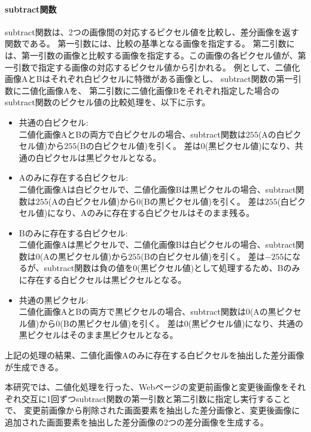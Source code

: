 \paragraph{subtract関数}
subtract関数は、2つの画像間の対応するピクセル値を比較し、差分画像を返す関数である。
第一引数には、比較の基準となる画像を指定する。
第二引数には、第一引数の画像と比較する画像を指定する。この画像の各ピクセル値が、第一引数で指定する画像の対応するピクセル値から引かれる。
例として、二値化画像AとBはそれぞれ白ピクセルに特徴がある画像とし、
subtract関数の第一引数に二値化画像Aを、
第二引数に二値化画像Bをそれぞれ指定した場合のsubtract関数のピクセル値の比較処理を、以下に示す。
\par
\begin{itemize}
      \setlength{\itemsep}{0pt}
            \setlength{\parsep}{0pt}
      \item 共通の白ピクセル:\\
            二値化画像AとBの両方で白ピクセルの場合、subtract関数は$255$(Aの白ピクセル値)から$255$(Bの白ピクセル値)を引く。
            差は$0$(黒ピクセル値)になり、共通の白ピクセルは黒ピクセルとなる。
      \item Aのみに存在する白ピクセル:\\
            二値化画像Aは白ピクセルで、二値化画像Bは黒ピクセルの場合、subtract関数は$255$(Aの白ピクセル値)から$0$(Bの黒ピクセル値)を引く。
            差は$255$(白ピクセル値)になり、Aのみに存在する白ピクセルはそのまま残る。
      \item Bのみに存在する白ピクセル:\\
            二値化画像Aは黒ピクセルで、二値化画像Bは白ピクセルの場合、subtract関数は$0$(Aの黒ピクセル値)から$255$(Bの白ピクセル値)を引く。
            差は$-255$になるが、subtract関数は負の値を$0$(黒ピクセル値)として処理するため、Bのみに存在する白ピクセルは黒ピクセルとなる。
      \item 共通の黒ピクセル:\\
            二値化画像AとBの両方で黒ピクセルの場合、subtract関数は$0$(Aの黒ピクセル値)から$0$(Bの黒ピクセル値)を引く。
            差は$0$(黒ピクセル値)になり、共通の黒ピクセルはそのまま黒ピクセルとなる。
\end{itemize}
上記の処理の結果、二値化画像Aのみに存在する白ピクセルを抽出した差分画像が生成できる。
\par
本研究では、二値化処理を行った、Webページの変更前画像と変更後画像をそれぞれ交互に1回ずつsubtract関数の第一引数と第二引数に指定し実行することで、
変更前画像から削除された画面要素を抽出した差分画像と、変更後画像に追加された画面要素を抽出した差分画像の2つの差分画像を生成する。
